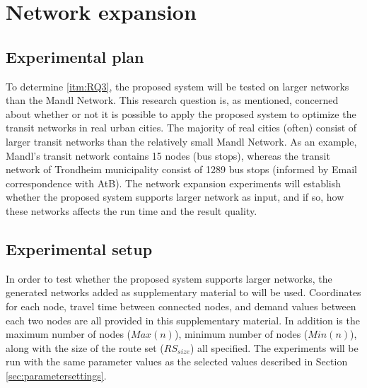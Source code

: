 \section{Network expansion}
\label{sec:networkExpansion}
\subsection{Experimental plan}
To determine \vref{itm:RQ3}, the proposed system will be tested on larger networks than the Mandl Network. This research question is, as mentioned, concerned about whether or not it is possible to apply the proposed system to optimize the transit networks in real urban cities. The majority of real cities (often) consist of larger transit networks than the relatively small Mandl Network. As an example, Mandl's transit network contains 15 nodes (bus stops), whereas the transit network of Trondheim municipality consist of 1289 bus stops (informed by Email correspondence with AtB\citep{website:atb}). The network expansion experiments will establish whether the proposed system supports larger network as input, and if so, how these networks affects the run time and the result quality.



\subsection{Experimental setup}
\label{subsec:scalabilityExperiments_setup}

In order to test whether the proposed system supports larger networks, the generated networks added as supplementary material to \citet{mumford13} will be used. Coordinates for each node, travel time between connected nodes, and demand values between each two nodes are all provided in this supplementary material. In addition is the maximum number of nodes ($Max(n)$), minimum number of nodes ($Min(n)$), along with the size of the route set ($RS_{size}$) all specified. The experiments will be run with the same parameter values as the selected values described in Section \vref{sec:parametersettings}.

